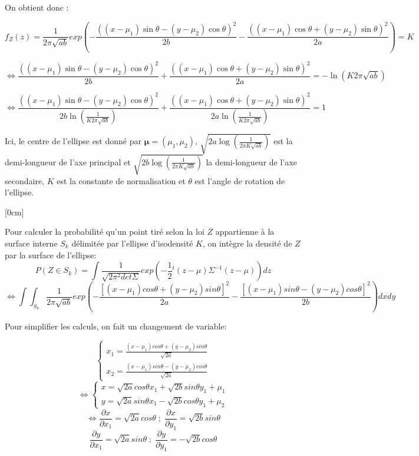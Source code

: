 \documentclass{article}
\begin{document}
On obtient donc :

$$ f_Z(z) = \frac{1}{2\pi \sqrt{ab}}exp(-\frac{((x-\mu_1)\sin\theta-(y-\mu_2)\cos\theta)^{2}}{2b}-\frac{((x-\mu_1)\cos\theta+(y-\mu_2)\sin\theta)^{2}}{2a})=K$$

$$\Leftrightarrow   \frac{((x-\mu_1)\sin\theta-(y-\mu_2)\cos\theta)^{2}}{2b}+\frac{((x-\mu_1)\cos\theta+(y-\mu_2)\sin\theta)^{2}}{2a}=-\ln(K2\pi\sqrt{ab})$$

$$\Leftrightarrow   \frac{((x-\mu_1)\sin\theta-(y-\mu_2)\cos\theta)^{2}}{2b\ln(\frac{1}{K2\pi\sqrt{ab}})}+\frac{((x-\mu_1)\cos\theta+(y-\mu_2)\sin\theta)^{2}}{2a\ln(\frac{1}{K2\pi\sqrt{ab}})}=1$$

Ici, le centre de l'ellipse est donné par $\mathbf{\mu} = (\mu_1, \mu_2)$, $\sqrt{2a \log(\frac{1}{2\pi K \sqrt{ab}})}$ est la demi-longueur de l'axe principal et $\sqrt{2b \log(\frac{1}{2\pi K \sqrt{ab}})}$ la demi-longueur de l'axe secondaire, $K$ est la constante de normalisation et $\theta$ est l'angle de rotation de l'ellipse.

\reversemarginpar{}[0cm]

Pour calculer la probabilité qu'un point tiré selon la loi $Z$ appartienne à la surface interne $S_k$ délimitée par l'ellipse d'isodensité $K$, on intègre la densité de $Z$ par la surface de l'ellipse:
$$P(Z \in S_k) = \int \frac{1}{\sqrt{2\pi^2det\Sigma}}exp(-\frac{1}{2} {}^{t}(z-\mu)\Sigma^{-1}(z-\mu)) dz$$
$$\Leftrightarrow \int\int_{S_k}^{} \frac{1}{2\pi\sqrt{ab}}exp(-\frac{[(x-\mu_1)cos\theta+(y-\mu_2)sin\theta]^2}{2a}-\frac{[(x-\mu_1)sin\theta-(y-\mu_2)cos\theta]^2}{2b})dxdy$$

Pour simplifier les calculs, on fait un changement de variable:

$$\left\{\begin{matrix}x_1=\frac{(x-\mu_1)cos\theta+(y-\mu_2)sin\theta}{\sqrt{2a}}
    \\ x_2=\frac{(x-\mu_1)sin\theta-(y-\mu_2)cos\theta}{\sqrt{2a}}
    \end{matrix}\right.$$
$$\Leftrightarrow 
\left\{\begin{matrix}x=\sqrt{2a}cos\theta x_1+\sqrt{2b}sin\theta y_1 +\mu_1
\\ y=\sqrt{2a}sin\theta x_1-\sqrt{2b}cos\theta y_1 +\mu_2
\end{matrix}\right.$$
$$\Leftrightarrow 
\frac{\partial x}{\partial x_1}=\sqrt{2a}cos\theta\; ;\; \frac{\partial x}{\partial y_1}=\sqrt{2b}sin\theta$$
$$
\frac{\partial y}{\partial x_1}=\sqrt{2a}sin\theta\; ;\; \frac{\partial y}{\partial y_1}=-\sqrt{2b}cos\theta$$
\end{document}
